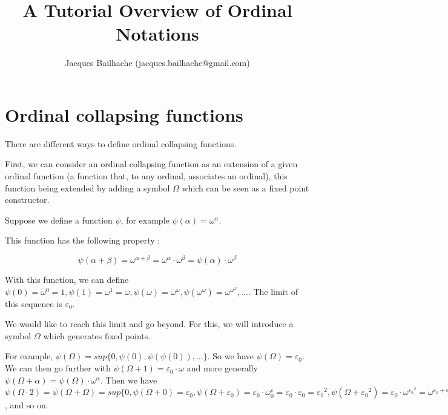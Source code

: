 \documentclass[10pt]{article}
\begin{document}
\title{A Tutorial Overview of Ordinal Notations}
\author{Jacques Bailhache (jacques.bailhache@gmail.com)}

\maketitle

\setlength{\parindent}{0pt}

\section{Ordinal collapsing functions}

There are different ways to define ordinal collapsing functions.

First, we can consider an ordinal collapsing function as an extension of a given ordinal function (a function that, to any ordinal, associates an ordinal), this function being extended by adding a symbol \( \Omega \) which can be seen as a fixed point constructor.

Suppose we define a function \( \psi \), for example \( \psi(\alpha) = \omega^\alpha \).

This function has the following property : 

\[ \psi(\alpha+\beta) = \omega^{\alpha+\beta} = \omega^\alpha \cdot \omega^\beta = \psi(\alpha) \cdot \omega^\beta \]

With this function, we can define \( \psi(0) = \omega^0 = 1, \psi(1) = \omega^1 = \omega, \psi(\omega) = \omega^\omega, \psi(\omega^\omega) = \omega^{\omega^\omega}, ... \). The limit of this sequence is  \( \varepsilon_0 \). 

We would like to reach this limit and go beyond. For this, we will introduce a symbol \( \Omega \) which generates fixed points. 

 For example, \( \psi(\Omega) = sup \lbrace 0, \psi(0), \psi(\psi(0)), \ldots \rbrace \). So we have \( \psi(\Omega) = \varepsilon_0 \). We can then go further with \( \psi(\Omega+1) = \varepsilon_0 \cdot \omega \) and more generally \( \psi(\Omega+\alpha) = \psi(\Omega) \cdot \omega^\alpha \). Then we have \( \psi(\Omega \cdot 2) = \psi(\Omega + \Omega) = sup \lbrace 0, \psi(\Omega+0) = \varepsilon_0, \psi(\Omega+\varepsilon_0) = \varepsilon_0 \cdot \omega^\varepsilon_0 = \varepsilon_0 \cdot \varepsilon_0 = {\varepsilon_0}^2, \psi(\Omega+{\varepsilon_0}^2) = \varepsilon_0 \cdot \omega^{{\varepsilon_0}^2} = \omega^{\varepsilon_0+{\varepsilon_0}^2} = \omega^{{\varepsilon_0}^2}, \psi(\Omega+\omega^{{\varepsilon_0}^2}) = \omega^{\omega^{{\varepsilon_0}^2}}, \ldots \rbrace = \varepsilon_1 \), and so on.
\end{document}
